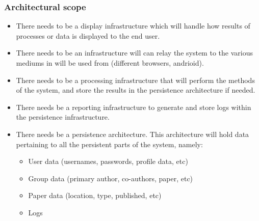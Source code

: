 \documentclass[11pt]{article}
\begin{document}
	\subsubsection{Architectural scope}
		\begin{itemize}
			\item There needs to be a display infrastructure which will handle how results of processes or data is displayed to the end user.
			\item There needs to be an infrastructure will can relay the system to the various mediums in will be used from (different browsers, andrioid).
			\item There needs to be a processing infrastructure that will perform the methods of the system, and store the results in the persistence architecture if needed.
			\item There needs be a reporting infrastructure to generate and store logs within the persistence infrastructure.
			\item There needs be a persistence architecture. This architecture will hold data pertaining to all the persistent parts of the system, namely:
			\begin{itemize}
				\item User data (usernames, passwords, profile data, etc)
				\item Group data (primary author, co-authors, paper, etc)
				\item Paper data (location, type, published, etc)
				\item Logs
			\end{itemize}
		\end{itemize}
	
\end{document}
